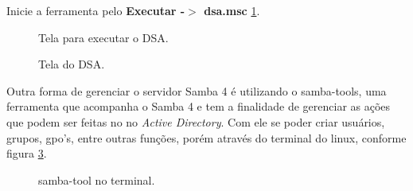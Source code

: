 Inicie a ferramenta pelo \textbf{Executar -$>$ dsa.msc} \ref{dsa}.

\begin{figure}[ht]
   	\centering
   	\caption{Tela para executar o DSA.}
    \label{dsa}
\end{figure}
 

\begin{figure}[h!]
   	\centering
   	\caption{Tela do DSA.}
    \label{tela_dsa}
\end{figure}


Outra forma de gerenciar o servidor Samba 4 é utilizando o samba-tools, uma ferramenta que acompanha o Samba 4 e tem a finalidade de gerenciar as ações que podem ser feitas no no \textit{Active Directory}. Com ele se poder criar usuários, grupos, gpo's, entre outras funções, porém através do terminal do linux, conforme figura \ref{samba-tool}.

\begin{figure}[h!]
   	\centering
   	\caption{samba-tool no terminal.}
    \label{samba-tool}
\end{figure}

